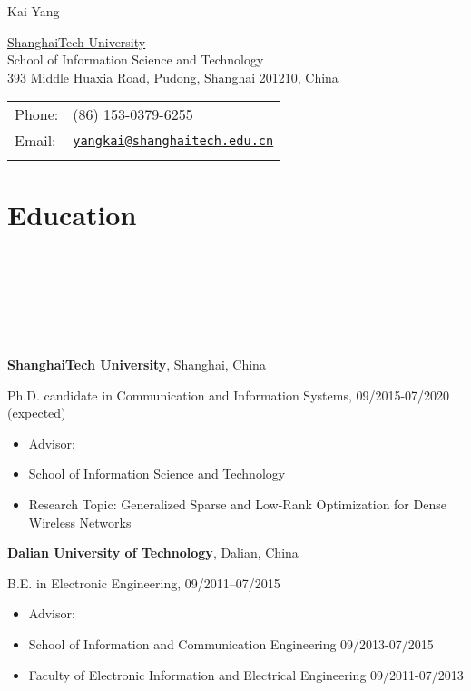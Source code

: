 \documentclass{article}
\def\name{Kai Yang}
\newcommand{\homepage}[3][homepagecolor]{\href{#2}{\color{#1}{#3}}}
\begin{document}
{\huge \name}


\vspace{0.2in}

\begin{minipage}{0.55\linewidth}
  \href{http://www.shanghaitech.edu.cn}{ShanghaiTech University} \\
  School of Information Science and Technology \\
393 Middle Huaxia Road, Pudong, Shanghai 201210, China
\end{minipage}\hspace{2em}
\begin{minipage}{0.45\linewidth}
  \begin{tabular}{ll}
    Phone: & (86) 153-0379-6255 \\
    Email: & \href{mailto:yangkai@shanghaitech.edu.cn}{\tt yangkai@shanghaitech.edu.cn} \\ &\\
  \end{tabular}
\end{minipage}


\section*{\colorbox{mygrey}{Education~~~~~~~~~~~~~~~~~~~~~~~~~~~~~~~~~~~~~~~~~~~~~~~~~~~~~~~~~~~~~~~~~~~~~~~~~~~~~~~~~~~~~~~~~~~}}
{\bf{ShanghaiTech University}}, Shanghai, China

Ph.D. candidate in Communication and Information Systems, 09/2015-07/2020 (expected) 
\begin{itemize}
  \item Advisor: \homepage{http://shiyuanming.github.io/}{Prof. Yuanming Shi}
  \item School of Information Science and Technology
  \item Research Topic: {{Generalized Sparse and Low-Rank Optimization for Dense Wireless Networks}}
\end{itemize}

{\bf{Dalian University of Technology}}, Dalian, China

B.E. in Electronic Engineering, 09/2011--07/2015
\begin{itemize}
\item Advisor: \homepage{http://faculty.dlut.edu.cn/GuoYanqing}{Prof. Yanqing Guo}
\item School of Information and Communication Engineering 09/2013-07/2015
\item Faculty of Electronic Information and Electrical Engineering 09/2011-07/2013
\end{itemize}
\end{document}

